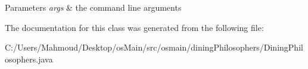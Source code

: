 \begin{DoxyParams}{Parameters}
{\em args} & the command line arguments \\
\hline
\end{DoxyParams}


The documentation for this class was generated from the following file\+:\begin{DoxyCompactItemize}
\item 
C\+:/\+Users/\+Mahmoud/\+Desktop/os\+Main/src/osmain/dining\+Philosophers/Dining\+Philosophers.\+java\end{DoxyCompactItemize}
